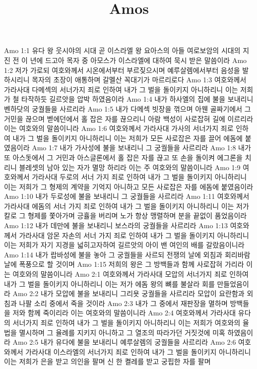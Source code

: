 

\title{Amos}

Amo 1:1  유다 왕 웃시야의 시대 곧 이스라엘 왕 요아스의 아들 여로보암의 시대의 지진 전 이 년에 드고아 목자 중 아모스가 이스라엘에 대하여 묵시 받은 말씀이라
Amo 1:2  저가 가로되 여호와께서 시온에서부터 부르짖으시며 예루살렘에서부터 음성을 발하시리니 목자의 초장이 애통하며 갈멜산 꼭대기가 마르리로다
Amo 1:3  여호와께서 가라사대 다메섹의 서너가지 죄로 인하여 내가 그 벌을 돌이키지 아니하리니 이는 저희가 철 타작하듯 길르앗을 압박 하였음이라
Amo 1:4  내가 하사엘의 집에 불을 보내리니 벤하닷의 궁궐들을 사르리라
Amo 1:5  내가 다메섹 빗장을 꺾으며 아웬 골짜기에서 그 거민을 끊으며 벧에던에서 홀 잡은 자를 끊으리니 아람 백성이 사로잡혀 길에 이르리라 이는 여호와의 말씀이니라
Amo 1:6  여호와께서 가라사대 가사의 서너가지 죄로 인하여 내가 그 벌을 돌이키지 아니하리니 이는 저희가 모든 사로잡은 자를 끌어 에돔에 붙였음이라
Amo 1:7  내가 가사성에 불을 보내리니 그 궁궐들을 사르리라
Amo 1:8  내가 또 아스돗에서 그 거민과 아스글론에서 홀 잡은 자를 끊고 또 손을 돌이켜 에그론을 치리니 블레셋의 남아 있는 자가 멸망 하리라 이는 주 여호와의 말씀이니라
Amo 1:9  여호와께서 가라사대 두로의 서너 가지 죄로 인하여 내가 그 벌을 돌이키지 아니하리니 이는 저희가 그 형제의 계약을 기억지 아니하고 모든 사로잡은 자를 에돔에 붙였음이라
Amo 1:10  내가 두로성에 불을 보내리니 그 궁궐들을 사르리라
Amo 1:11  여호와께서 가라사대 에돔의 서너 가지 죄로 인하여 내가 그 벌을 돌이키지 아니하리니 이는 저가 칼로 그 형제를 쫓아가며 긍휼을 버리며 노가 항상 맹렬하며 분을 끝없이 품었음이라
Amo 1:12  내가 데만에 불을 보내리니 보스라의 궁궐들을 사르리라
Amo 1:13  여호와께서 가라사대 암몬 자손의 서너 가지 죄로 인하여 내가 그 벌을 돌이키지 아니하리니 이는 저희가 자기 지경을 넓히고자하여 길르앗의 아이 밴 여인의 배를 갈랐음이니라
Amo 1:14  내가 랍바성에 불을 놓아 그 궁궐들을 사르되 전쟁의 날에 외침과 회리바람 날에 폭풍으로 할 것이며
Amo 1:15  저희의 왕은 그 방백들과 함께 사로잡혀 가리라 이는 여호와의 말씀이니라
Amo 2:1  여호와께서 가라사대 모압의 서너가지 죄로 인하여 내가 그 벌을 돌이키지 아니하리니 이는 저가 에돔 왕의 뼈를 불살라 회를 만들었음이라
Amo 2:2  내가 모압에 불을 보내리니 그리욧 궁궐들을 사르리라 모압이 요란함과 외침과 나팔 소리 중에서 죽을 것이라
Amo 2:3  내가 그 중에서 재판장을 멸하며 방백들을 저와 함께 죽이리라 이는 여호와의 말씀이니라
Amo 2:4  여호와께서 가라사대 유다의 서너가지 죄로 인하여 내가 그 벌을 돌이키지 아니하리니 이는 저희가 여호와의 율법을 멸시하며 그 율례를 지키지 아니하고 그 열조의 따라가던 거짓것에 미혹 하였음이라
Amo 2:5  내가 유다에 불을 보내리니 예루살렘의 궁궐들을 사르리라
Amo 2:6  여호와께서 가라사대 이스라엘의 서너가지 죄로 인하여 내가 그 벌을 돌이키지 아니하리니 이는 저희가 은을 받고 의인을 팔며 신 한 켤레를 받고 궁핍한 자를 팔며
